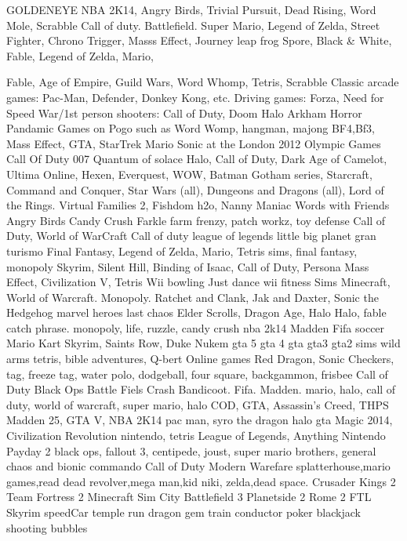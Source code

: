 GOLDENEYE
NBA 2K14, Angry Birds,  Trivial Pursuit, Dead Rising, Word Mole, Scrabble
Call of duty.  Battlefield.   
Super Mario, Legend of Zelda, Street Fighter, Chrono Trigger, Masss Effect, Journey
leap frog
Spore, Black & White, Fable, Legend of Zelda, Mario, 

Fable, Age of Empire, Guild Wars, Word Whomp, Tetris, Scrabble
Classic arcade games: Pac-Man, Defender, Donkey Kong, etc.  Driving games: Forza, Need for Speed  War/1st person shooters: Call of Duty, Doom
Halo  Arkham Horror  Pandamic
Games on Pogo such as Word Womp, hangman, majong
BF4,Bf3, Mass Effect, GTA, StarTrek
Mario  Sonic at the London 2012 Olympic Games  Call Of Duty  007 Quantum of solace    
Halo, Call of Duty, Dark Age of Camelot, Ultima Online, Hexen, Everquest, WOW, Batman Gotham series, Starcraft, Command and Conquer, Star Wars (all), Dungeons and Dragons (all), Lord of the Rings.
Virtual Families 2, Fishdom h2o, Nanny Maniac 
Words with Friends  Angry Birds  Candy Crush  Farkle
farm frenzy, patch workz, toy defense
Call of Duty, World of WarCraft
Call of duty league of legends little big planet gran turismo
Final Fantasy, Legend of Zelda, Mario, Tetris
sims, final fantasy, monopoly
Skyrim, Silent Hill, Binding of Isaac, Call of Duty, Persona
Mass Effect, Civilization V, Tetris
Wii bowling  Just dance  wii fitness  Sims
Minecraft, World of Warcraft. Monopoly.
Ratchet and Clank, Jak and Daxter, Sonic the Hedgehog
marvel heroes   last chaos 
Elder Scrolls, Dragon Age, Halo
Halo, fable
catch phrase. monopoly, life, ruzzle, candy crush
nba 2k14
Madden  Fifa soccer  Mario Kart
Skyrim, Saints Row, Duke Nukem
gta 5 gta 4 gta gta3 gta2 
sims   wild arms   
tetris, bible adventures, Q-bert
Online games
Red Dragon, Sonic
Checkers, tag, freeze tag, water polo, dodgeball, four square, backgammon, frisbee
Call of Duty  Black Ops  Battle Fiels
Crash Bandicoot. Fifa. Madden. 
mario, halo, call of duty, 
world of warcraft, super mario, halo
COD, GTA, Assassin's Creed, THPS
Madden 25, GTA V, NBA 2K14
pac man, syro the dragon
halo gta
Magic 2014, Civilization Revolution
nintendo, tetris
League of Legends, Anything Nintendo
Payday 2
black ops, fallout 3, centipede, joust, super mario brothers, general chaos and bionic commando
Call of Duty Modern Warefare
splatterhouse,mario games,read dead revolver,mega man,kid niki, zelda,dead space.
Crusader Kings 2  Team Fortress 2  Minecraft  Sim City   Battlefield 3  Planetside 2  Rome 2  FTL  Skyrim
speedCar
temple run  dragon gem  train conductor  
poker  blackjack  shooting bubbles